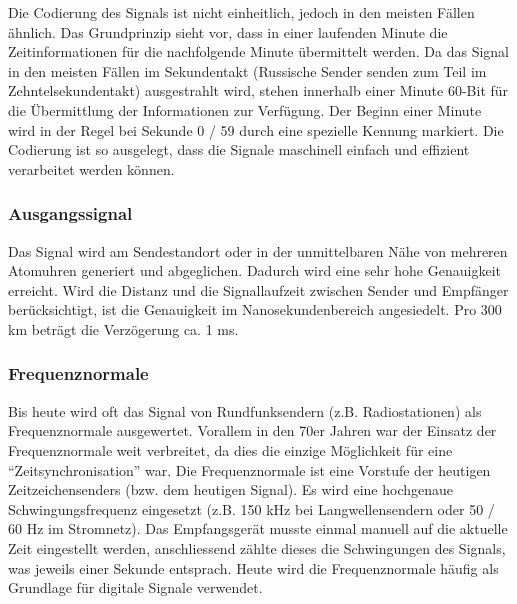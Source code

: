 Die Codierung des Signals ist nicht einheitlich, jedoch in den meisten Fällen ähnlich. Das Grundprinzip sieht vor, dass in einer laufenden Minute die Zeitinformationen für die nachfolgende Minute übermittelt werden. Da das Signal in den meisten Fällen im Sekundentakt (Russische Sender senden zum Teil im Zehntelsekundentakt) ausgestrahlt wird, stehen innerhalb einer Minute 60-Bit für die Übermittlung der Informationen zur Verfügung. Der Beginn einer Minute wird in der Regel bei Sekunde 0 / 59 durch eine spezielle Kennung markiert. Die Codierung ist so ausgelegt, dass die Signale maschinell einfach und effizient verarbeitet werden können.

\subsubsection{Ausgangssignal}
Das Signal wird am Sendestandort oder in der unmittelbaren Nähe von mehreren Atomuhren generiert und abgeglichen. Dadurch wird eine sehr hohe Genauigkeit erreicht. Wird die Distanz und die Signallaufzeit zwischen Sender und Empfänger berücksichtigt, ist die Genauigkeit im Nanosekundenbereich angesiedelt. Pro 300 km beträgt die Verzögerung ca. 1 ms.

\subsubsection{Frequenznormale} \label{subsubsec:Analyse:Frequenznormale}
Bis heute wird oft das Signal von Rundfunksendern (z.B. Radiostationen) als Frequenznormale ausgewertet. Vorallem in den 70er Jahren war der Einsatz der Frequenznormale weit verbreitet, da dies die einzige Möglichkeit für eine "`Zeitsynchronisation"' war. Die Frequenznormale ist eine Vorstufe der heutigen Zeitzeichensenders (bzw. dem heutigen Signal). Es wird eine hochgenaue Schwingungsfrequenz eingesetzt (z.B. 150 kHz bei Langwellensendern oder 50 / 60 Hz im Stromnetz). Das Empfangsgerät musste einmal manuell auf die aktuelle Zeit eingestellt werden, anschliessend zählte dieses die Schwingungen des Signals, was jeweils einer Sekunde entsprach. Heute wird die Frequenznormale häufig als Grundlage für digitale Signale verwendet. 

